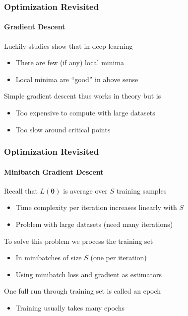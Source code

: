\documentclass[xetex,professionalfont]{beamer}
\renewcommand\emph[1]{\textcolor{tuwcvl_cvl_blue}{#1}}
\newcommand{\bth}{\boldsymbol{\theta}}
\begin{document}
\begin{frame}
  \frametitle{Optimization Revisited}
  \framesubtitle{Gradient Descent}
  
Luckily studies show that in deep learning
\begin{itemize}
  \item There are few (if any) local minima
  \item Local minima are \enquote{good} in above sense %
\end{itemize}

\bigskip

Simple gradient descent thus works in theory but is
\begin{itemize}
  \item Too expensive to compute with large datasets
  \item Too slow around critical points %
\end{itemize}
  
\end{frame}


\begin{frame}
\frametitle{Optimization Revisited}
\framesubtitle{Minibatch Gradient Descent}

Recall that $L(\bth)$ is average over $S$ training samples
\begin{itemize}
    \item Time complexity per iteration increases linearly with $S$
    \item Problem with large datasets (need many iterations)
\end{itemize}

\bigskip

To solve this problem we process the training set
\begin{itemize}
    \item In \emph{minibatches} of size $S$ (one per iteration) %
    \item Using minibatch loss and gradient as estimators %
\end{itemize}

\bigskip

One full run through training set is called an \emph{epoch}
\begin{itemize}
    \item Training usually takes many epochs
\end{itemize}

\end{frame}
\end{document}
